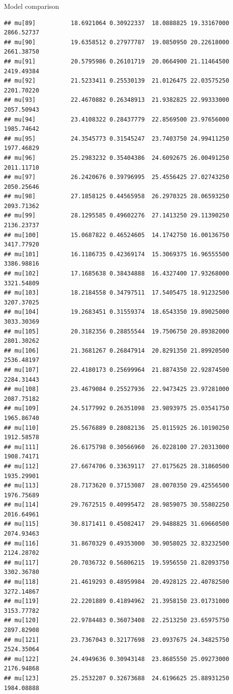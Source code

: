 \documentclass[
  ignorenonframetext,
]{beamer}
\begin{document}
\begin{frame}[fragile]{Model comparison}
\begin{verbatim}
## mu[89]          18.6921064 0.30922337  18.0888825 19.33167000 2866.52737
## mu[90]          19.6358512 0.27977787  19.0850950 20.22618000 2661.38750
## mu[91]          20.5795986 0.26101719  20.0664900 21.11464500 2419.49384
## mu[92]          21.5233411 0.25530139  21.0126475 22.03575250 2201.70220
## mu[93]          22.4670882 0.26348913  21.9382825 22.99333000 2057.50943
## mu[94]          23.4108322 0.28437779  22.8569500 23.97656000 1985.74642
## mu[95]          24.3545773 0.31545247  23.7403750 24.99411250 1977.46829
## mu[96]          25.2983232 0.35404386  24.6092675 26.00491250 2011.11710
## mu[97]          26.2420676 0.39796995  25.4556425 27.02743250 2050.25646
## mu[98]          27.1858125 0.44565958  26.2970325 28.06593250 2093.71362
## mu[99]          28.1295585 0.49602276  27.1413250 29.11390250 2136.23737
## mu[100]         15.0687822 0.46524605  14.1742750 16.00136750 3417.77920
## mu[101]         16.1186735 0.42369174  15.3069375 16.96555500 3386.98816
## mu[102]         17.1685638 0.38434888  16.4327400 17.93268000 3321.54809
## mu[103]         18.2184558 0.34797511  17.5405475 18.91232500 3207.37025
## mu[104]         19.2683451 0.31559374  18.6543350 19.89025000 3033.30369
## mu[105]         20.3182356 0.28855544  19.7506750 20.89382000 2801.30262
## mu[106]         21.3681267 0.26847914  20.8291350 21.89920500 2536.48197
## mu[107]         22.4180173 0.25699964  21.8874350 22.92874500 2284.31443
## mu[108]         23.4679084 0.25527936  22.9473425 23.97281000 2087.75182
## mu[109]         24.5177992 0.26351098  23.9893975 25.03541750 1965.86740
## mu[110]         25.5676889 0.28082136  25.0115925 26.10190250 1912.58578
## mu[111]         26.6175798 0.30566960  26.0228100 27.20313000 1908.74171
## mu[112]         27.6674706 0.33639117  27.0175625 28.31860500 1935.29901
## mu[113]         28.7173620 0.37153087  28.0070350 29.42556500 1976.75689
## mu[114]         29.7672515 0.40995472  28.9859075 30.55802250 2016.64961
## mu[115]         30.8171411 0.45082417  29.9488825 31.69660500 2074.93463
## mu[116]         31.8670329 0.49353000  30.9058025 32.83232500 2124.28702
## mu[117]         20.7036732 0.56806215  19.5956550 21.82093750 3302.36780
## mu[118]         21.4619293 0.48959984  20.4928125 22.40782500 3272.14867
## mu[119]         22.2201889 0.41894962  21.3958150 23.01731000 3153.77782
## mu[120]         22.9784483 0.36073408  22.2513250 23.65975750 2897.82908
## mu[121]         23.7367043 0.32177698  23.0937675 24.34825750 2524.35064
## mu[122]         24.4949636 0.30943148  23.8685550 25.09273000 2176.94868
## mu[123]         25.2532207 0.32673688  24.6196625 25.88931250 1984.08888

\end{verbatim}
\end{frame}
\end{document}
